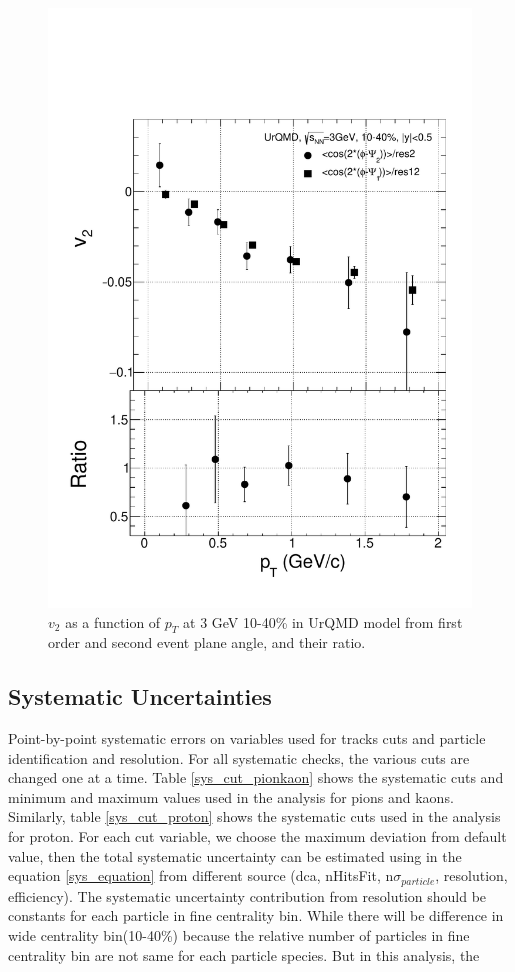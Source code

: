 \begin{figure}[h]
\includegraphics[scale=0.6]{chapter3/fig/second/v2pt_urqdm.pdf}
\caption{\label{v2pt_urqmd_com} $v_{2}$ as a function of $p_{T}$ at 3 GeV 10-40\% in UrQMD model from first order and second event plane angle, and their ratio.}
\end{figure}


\clearpage
\subsection{Systematic Uncertainties}

Point-by-point systematic errors on variables used for tracks cuts and particle identification and resolution. For all systematic checks, the various cuts are changed one at a time. Table \ref{sys_cut_pionkaon} shows the systematic cuts and minimum and maximum values used in the analysis for pions and kaons. Similarly, table \ref{sys_cut_proton} shows the systematic cuts used in the analysis for proton. 
For each cut variable, we choose the maximum deviation from default value, then the total systematic uncertainty can be estimated using in the equation \ref{sys_equation} from different source (dca, nHitsFit, n$\sigma_{particle}$, resolution, efficiency). The systematic uncertainty contribution from resolution should be constants for each particle in fine centrality bin. While there will be difference in wide centrality bin(10-40\%) because the relative number of particles in fine centrality bin are not same for each particle species. But in this analysis, the  

